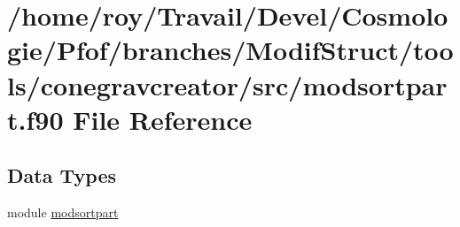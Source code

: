 \hypertarget{conegravcreator_2src_2modsortpart_8f90}{\section{/home/roy/\-Travail/\-Devel/\-Cosmologie/\-Pfof/branches/\-Modif\-Struct/tools/conegravcreator/src/modsortpart.f90 File Reference}
\label{conegravcreator_2src_2modsortpart_8f90}
}
\subsection*{Data Types}
\begin{DoxyCompactItemize}
\item 
module \hyperlink{classmodsortpart}{modsortpart}
\end{DoxyCompactItemize}
